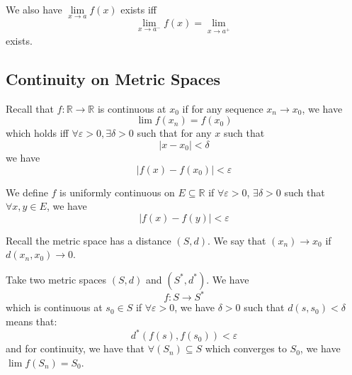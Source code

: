 \documentclass{report}
\begin{document}
We also have $\lim\limits_{x \to a}f(x)$ exists iff 
    \begin{equation*}
        \lim\limits_{x \to a^{-}}f(x) = \lim\limits_{x \to a^{+}}
    \end{equation*}
exists.

\begin{topic}
    \section{Continuity on Metric Spaces}
\end{topic}

Recall that $f : \mathbb{R} \rightarrow \mathbb{R}$ is continuous at $x_{0}$ if for any sequence $x_{n} \rightarrow x_{0}$, we have 
    \begin{equation*}
        \lim f(x_{n}) = f(x_{0})
    \end{equation*}
which holds iff $\forall \varepsilon> 0, \exists \delta > 0$ such that for any $x$ such that
    \begin{equation*}
        \lvert x - x_{0} \rvert < \delta
    \end{equation*}
we have
    \begin{equation*}
        \lvert f(x) - f(x_{0}) \rvert < \varepsilon
    \end{equation*}

We define $f$ is uniformly continuous on $E \subseteq \mathbb{R}$ if $\forall \varepsilon> 0$, $\exists \delta> 0$ such that $\forall x, y \in E$, we have
    \begin{equation*}
        \lvert f(x) - f(y) \rvert < \varepsilon
    \end{equation*}

Recall the metric space has a distance $(S, d)$. We say that $(x_{n}) \rightarrow x_{0}$ if $d(x_{n}, x_{0}) \rightarrow  0$. 

\begin{definition}{}
    Take two metric spaces $(S, d)$ and $(S^{*}, d^{*})$. We have
        \begin{equation*}
            f: S \rightarrow S^{*}
        \end{equation*}
    which is continuous at $s_{0} \in S$ if $\forall \varepsilon > 0$, we have $\delta > 0$ such that $d(s, s_{0}) < \delta$ means that:
        \begin{equation*}
            d^{*}(f(s), f(s_{0})) < \varepsilon
        \end{equation*}
    and for continuity, we have that $\forall (S_{n}) \subseteq S$ which converges to $S_{0}$, we have $\lim f(S_{n}) = S_{0}$.
\end{definition}
\end{document}

